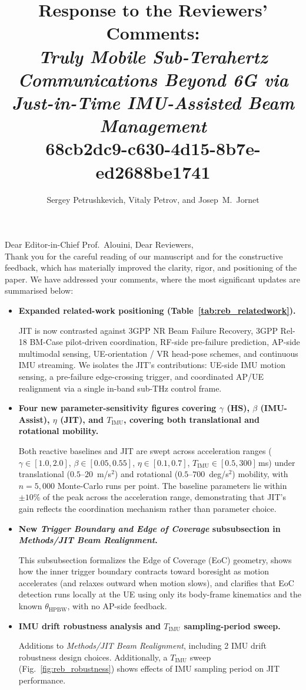 \documentclass{article}
\title{\vspace{-2.5cm}\textbf{Response to the Reviewers' Comments: \\ \emph{\Large Truly Mobile Sub-Terahertz Communications Beyond 6G via Just-in-Time IMU-Assisted Beam Management}}\\\Large 68cb2dc9-c630-4d15-8b7e-ed2688be1741}
\author{Sergey Petrushkevich, Vitaly Petrov, and Josep~M.~Jornet\\}
\date{}
\begin{document}
\maketitle

\noindent Dear Editor-in-Chief Prof.\ Alouini, Dear Reviewers,\\

\noindent Thank you for the careful reading of our manuscript and for the constructive feedback, which has materially improved the clarity, rigor, and positioning of the paper. We have addressed your comments, where the most significant updates are summarised below:

\begin{itemize}
    \setlength{\itemsep}{6pt}
    \item \textbf{Expanded related-work positioning (Table~\ref{tab:reb_relatedwork}).}

    JIT is now contrasted against 3GPP NR Beam Failure Recovery, 3GPP Rel-18 BM-Case pilot-driven coordination, RF-side pre-failure prediction, AP-side multimodal sensing, UE-orientation / VR head-pose schemes, and continuous IMU streaming. We isolates the JIT's contributions: UE-side IMU motion sensing, a pre-failure edge-crossing trigger, and coordinated AP/UE realignment via a single in-band sub-THz control frame.

    \item \textbf{Four new parameter-sensitivity figures covering $\gamma$ (HS), $\beta$ (IMU-Assist), $\eta$ (JIT), and $T_{\text{IMU}}$, covering both translational and rotational mobility.}

    Both reactive baselines and JIT are swept across acceleration ranges ($\gamma \in [1.0, 2.0]$, $\beta \in [0.05, 0.55]$, $\eta \in [0.1, 0.7]$, $T_{\text{IMU}} \in [0.5, 300]$\,ms) under translational ($0.5$--$20$~m/s$^2$) and rotational ($0.5$--$700$~deg/s$^2$) mobility, with $n = 5{,}000$ Monte-Carlo runs per point. The baseline parameters lie within $\pm 10\%$ of the peak across the acceleration range, demonstrating that JIT's gain reflects the coordination mechanism rather than parameter choice.

    \item \textbf{New \emph{Trigger Boundary and Edge of Coverage} subsubsection in \emph{Methods/JIT Beam Realignment}.}

    This subsubsection formalizes the Edge of Coverage (EoC) geometry, shows how the inner trigger boundary contracts toward boresight as motion accelerates (and relaxes outward when motion slows), and clarifies that EoC detection runs locally at the UE using only its body-frame kinematics and the known $\theta_{\text{HPBW}}$, with no AP-side feedback.

    \item \textbf{IMU drift robustness analysis and $T_{\text{IMU}}$ sampling-period sweep.}

    Additions to \emph{Methods/JIT Beam Realignment}, including 2 IMU drift robustness design choices. Additionally, a $T_{\text{IMU}}$ sweep (Fig.~\ref{fig:reb_robustness}) shows effects of IMU sampling period on JIT performance.
\end{itemize}
\end{document}

